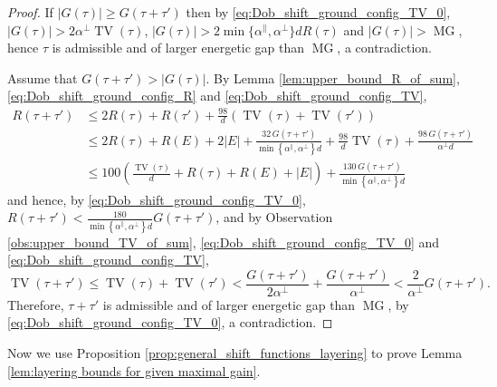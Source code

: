 \documentclass[11pt, reqno]{amsart}
\DeclareMathOperator{\TV}{TV}
\DeclareMathOperator{\MG}{MG}
\numberwithin{equation}{section}
\begin{document}
\begin{proof}
If $\lvert G(\tau)\rvert\geq G(\tau+\tau')$ then by \eqref{eq:Dob_shift_ground_config_TV_0}, $|G(\tau)| > 2\alpha^{\perp}\TV\left(\tau\right)$, 
$|G(\tau)|>2\min\{\alpha^{\parallel},\alpha^{\perp}\} d R\left(\tau\right)$ and $|G(\tau)|>\MG$, 
hence $\tau$ is admissible and of larger energetic gap than $\MG$, a contradiction.

Assume that $G(\tau+\tau')>\lvert G(\tau)\rvert$.
By Lemma \ref{lem:upper_bound_R_of_sum}, \eqref{eq:Dob_shift_ground_config_R} and \eqref{eq:Dob_shift_ground_config_TV},
\begin{align*}
R(\tau+\tau') &\leq 2R(\tau) +R(\tau')+\frac{98}{d}\left(\TV(\tau)+\TV(\tau')\right) \\
&\leq 2R(\tau)+R(E)+2|E|+\frac{32\, G(\tau+\tau')}{\min \left\{\alpha^{\parallel}, \alpha^{\perp}\right\} d} +\frac{98}{d}\TV(\tau)+\frac{98\, G(\tau+\tau')}{\alpha^{\perp} d}\\
&\leq 100\left(\frac{\TV(\tau)}{d}+R(\tau)+R(E)+|E|\right)+\frac{130\, G(\tau+\tau')}{\min \left\{\alpha^{\parallel}, \alpha^{\perp}\right\} d}
\end{align*}
and hence, by \eqref{eq:Dob_shift_ground_config_TV_0}, $R(\tau+\tau')<\frac{180}{\min \left\{\alpha^{\parallel}, \alpha^{\perp}\right\} d} G(\tau+\tau')$, and by Observation \ref{obs:upper_bound_TV_of_sum}, 
\eqref{eq:Dob_shift_ground_config_TV_0}
and \eqref{eq:Dob_shift_ground_config_TV},
\begin{equation*}\label{eq:TV_G}
\TV(\tau+\tau')\leq\TV(\tau) +\TV(\tau') < \frac{G(\tau+\tau')}{2\alpha^{\perp}} 
+\frac{G(\tau+\tau')}{\alpha^{\perp}}< \frac{2}{\alpha^{\perp}} G(\tau+\tau').
\end{equation*}
Therefore, $\tau+\tau'$ is admissible and of larger energetic gap than $\MG$, by \eqref{eq:Dob_shift_ground_config_TV_0}, a contradiction.
\end{proof}

Now we use Proposition \ref{prop:general_shift_functions_layering} to prove Lemma \ref{lem:layering bounds for given maximal gain}.
\end{document}
